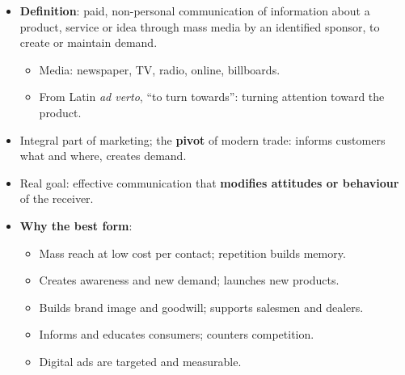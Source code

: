 {\color{sub}\footnotesize {} }
\begin{itemize}
  \item \textbf{Definition}: paid, non-personal communication of information about a product,
    service or idea through mass media by an identified sponsor, to create or maintain
    demand.
  \begin{itemize}
    \item Media: newspaper, TV, radio, online, billboards.
    \item From Latin \textit{ad verto}, ``to turn towards'': turning attention toward the
      product.
  \end{itemize}
  \item Integral part of marketing; the \textbf{pivot} of modern trade: informs customers
    what and where, creates demand.
  \item Real goal: effective communication that \textbf{modifies attitudes or behaviour} of
    the receiver.
  \item \textbf{Why the best form}:
  \begin{itemize}
    \item Mass reach at low cost per contact; repetition builds memory.
    \item Creates awareness and new demand; launches new products.
    \item Builds brand image and goodwill; supports salesmen and dealers.
    \item Informs and educates consumers; counters competition.
    \item Digital ads are targeted and measurable.
  \end{itemize}
\end{itemize}


